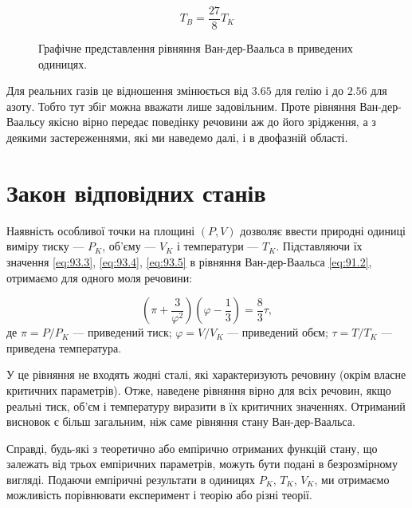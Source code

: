 \begin{equation}
T_{B} = \frac{27}{8}T_{K}
\label{eq:93.10}
\end{equation}

\begin{figure}[h!]\centering

\caption{Графічне представлення рівняння Ван-дер-Ваальса в приведених одиницях.}
\label{pic:8.7}
\end{figure}


Для реальних газів це відношення змінюється від $3.65$ для гелію і до $2.56$ для азоту. Тобто тут збіг
можна
вважати лише задовільним. Проте рівняння Ван-дер-Ваальсу якісно вірно передає поведінку речовини аж до
його зрідження, а з деякими застереженнями, які ми наведемо далі, і в двофазній області.


\section{Закон відповідних станів}

Наявність особливої точки на площині $(P, V)$ дозволяє ввести природні одиниці виміру тиску — $P_{K}$,
об'єму --- $V_{K}$ і температури --- $T_{K}$. Підставляючи їх значення \eqref{eq:93.3}, \eqref{eq:93.4}, \eqref{eq:93.5} в рівняння Ван-дер-Ваальса
\eqref{eq:91.2}, отримаємо для одного моля речовини:

\begin{equation}
\left( \pi + \frac{3}{\varphi^{2}} \right)\left( \varphi - \frac{1}{3} \right) = \frac{8}{3}\tau,
\label{eq:94.1}
\end{equation}
де $\pi = P / P_{K}$ --- приведений тиск; $\varphi = V / V_{K}$ --- приведений обєм; $\tau = T / T_{K}$ --- приведена температура.

У це рівняння не входять жодні сталі, які характеризують речовину (окрім власне критичних параметрів).
Отже, наведене рівняння вірно для всіх речовин, якщо реальні тиск, об'єм і температуру виразити в їх
критичних значеннях. Отриманий висновок є більш загальним, ніж саме рівняння стану Ван-дер-Ваальса.

Справді, будь-які з теоретично або емпірично отриманих функцій стану, що залежать від трьох емпіричних
параметрів, можуть бути подані в безрозмірному вигляді. Подаючи емпіричні результати в одиницях
$P_{K}$, $T_{K}$, $V_{K}$, ми отримаємо можливість порівнювати експеримент і теорію або різні теорії.

